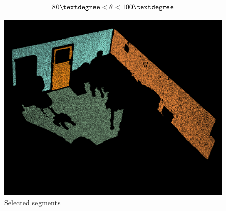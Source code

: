 			\begin{equation}
			80\textdegree < \theta < 100\textdegree
			\end{equation}
			\begin{figure}[H]
				\centering
				\includegraphics[width=0.7\linewidth]{"Includes/images/Selected segments"}
				\caption{Selected segments}
				\label{fig:Selectedsegments}
			\end{figure}
			
					
